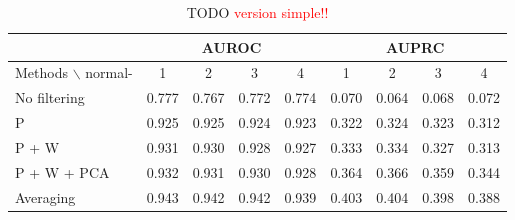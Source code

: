 \documentclass[wcp]{jmlr}
\begin{document}


\begin{table}[tbh]
\centering
\small
\begin{tabular}{@{}l *{8}{c}@{}}
\hline
  & \multicolumn{4}{c}{AUROC} & \multicolumn{4}{c}{AUPRC} \\
\hline
Methods $\backslash$ normal- & 1 & 2 & 3 & 4 & 1 & 2 & 3 & 4 \\
No  filtering       & 0.777 & 0.767 & 0.772 & 0.774 & 0.070 & 0.064 & 0.068 & 0.072\\
P                   & 0.925 & 0.925 & 0.924 & 0.923 & 0.322 & 0.324 & 0.323 & 0.312\\
P + W               & 0.931 & 0.930 & 0.928 & 0.927 & 0.333 & 0.334 & 0.327 & 0.313\\
P + W + PCA         & 0.932 & 0.931 & 0.930 & 0.928 & 0.364 & 0.366 & 0.359 & 0.344\\
Averaging           & 0.943 & 0.942 & 0.942 & 0.939 & 0.403 & 0.404 & 0.398 & 0.388\\
\end{tabular}
\caption{TODO \textcolor{red}{version simple!!}}
\label{tab:tab3}
\end{table}

\end{document}
